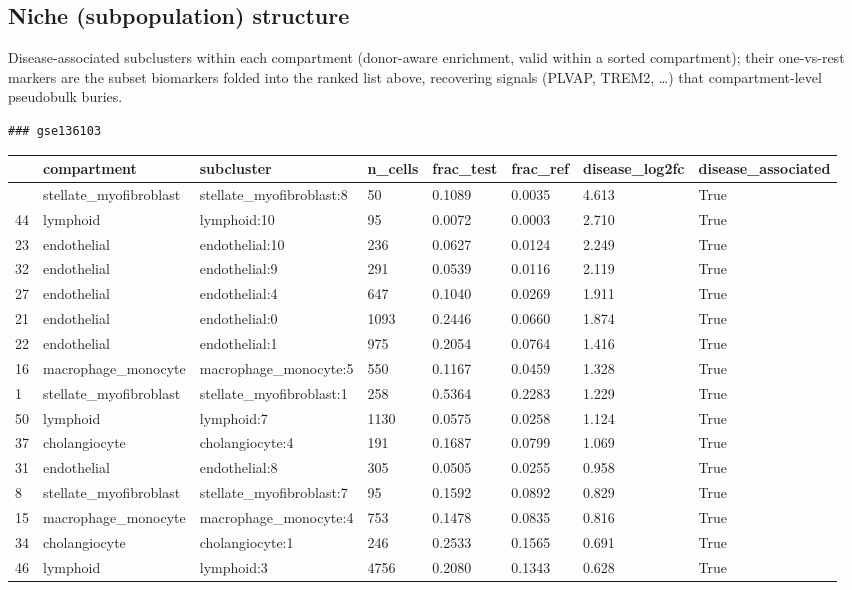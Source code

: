 \documentclass[
  letterpaper,
  DIV=11,
  numbers=noendperiod]{scrartcl}
\newcounter{none} %
\begin{document}
\subsection{Niche (subpopulation)
structure}\label{niche-subpopulation-structure}

Disease-associated subclusters within each compartment (donor-aware
enrichment, valid within a sorted compartment); their one-vs-rest
markers are the subset biomarkers folded into the ranked list above,
recovering signals (PLVAP, TREM2, \ldots) that compartment-level
pseudobulk buries.

\begin{verbatim}
### gse136103
\end{verbatim}

{\def\LTcaptype{none} %
\begin{longtable}[]{@{}llllllll@{}}
\toprule\noalign{}
& compartment & subcluster & n\_cells & frac\_test & frac\_ref &
disease\_log2fc & disease\_associated \\
\midrule\noalign{}
\endhead
\bottomrule\noalign{}
\endlastfoot
9 & stellate\_myofibroblast & stellate\_myofibroblast:8 & 50 & 0.1089 &
0.0035 & 4.613 & True \\
44 & lymphoid & lymphoid:10 & 95 & 0.0072 & 0.0003 & 2.710 & True \\
23 & endothelial & endothelial:10 & 236 & 0.0627 & 0.0124 & 2.249 &
True \\
32 & endothelial & endothelial:9 & 291 & 0.0539 & 0.0116 & 2.119 &
True \\
27 & endothelial & endothelial:4 & 647 & 0.1040 & 0.0269 & 1.911 &
True \\
21 & endothelial & endothelial:0 & 1093 & 0.2446 & 0.0660 & 1.874 &
True \\
22 & endothelial & endothelial:1 & 975 & 0.2054 & 0.0764 & 1.416 &
True \\
16 & macrophage\_monocyte & macrophage\_monocyte:5 & 550 & 0.1167 &
0.0459 & 1.328 & True \\
1 & stellate\_myofibroblast & stellate\_myofibroblast:1 & 258 & 0.5364 &
0.2283 & 1.229 & True \\
50 & lymphoid & lymphoid:7 & 1130 & 0.0575 & 0.0258 & 1.124 & True \\
37 & cholangiocyte & cholangiocyte:4 & 191 & 0.1687 & 0.0799 & 1.069 &
True \\
31 & endothelial & endothelial:8 & 305 & 0.0505 & 0.0255 & 0.958 &
True \\
8 & stellate\_myofibroblast & stellate\_myofibroblast:7 & 95 & 0.1592 &
0.0892 & 0.829 & True \\
15 & macrophage\_monocyte & macrophage\_monocyte:4 & 753 & 0.1478 &
0.0835 & 0.816 & True \\
34 & cholangiocyte & cholangiocyte:1 & 246 & 0.2533 & 0.1565 & 0.691 &
True \\
46 & lymphoid & lymphoid:3 & 4756 & 0.2080 & 0.1343 & 0.628 & True \\
\end{longtable}
}
\end{document}
